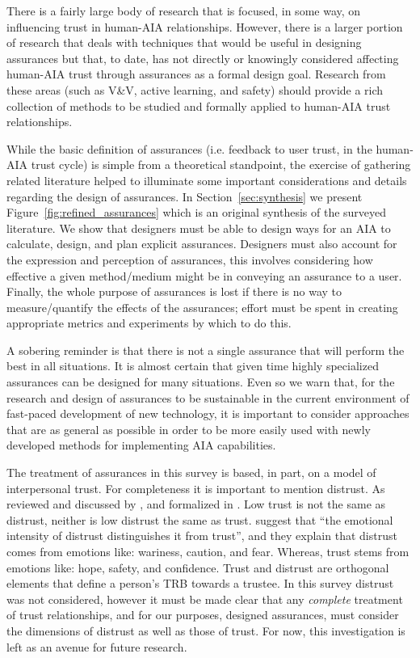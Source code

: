     There is a fairly large body of research that is focused, in some way, on influencing trust in human-AIA relationships. However, there is a larger portion of research that deals with techniques that would be useful in designing assurances but that, to date, has not directly or knowingly considered affecting human-AIA trust through assurances as a formal design goal. Research from these areas (such as V\&V, active learning, and safety) should provide a rich collection of methods to be studied and formally applied to human-AIA trust relationships.

    While the basic definition of assurances (i.e. feedback to user trust, in the human-AIA trust cycle) is simple from a theoretical standpoint, the exercise of gathering related literature helped to illuminate some important considerations and details regarding the design of assurances. In Section~\ref{sec:synthesis} we present Figure~\ref{fig:refined_assurances} which is an original synthesis of the surveyed literature. We show that designers must be able to design ways for an AIA to calculate, design, and plan explicit assurances. Designers must also account for the expression and perception of assurances, this involves considering how effective a given method/medium might be in conveying an assurance to a user. Finally, the whole purpose of assurances is lost if there is no way to measure/quantify the effects of the assurances; effort must be spent in creating appropriate metrics and experiments by which to do this.

    A sobering reminder is that there is not a single assurance that will perform the best in all situations. It is almost certain that given time highly specialized assurances can be designed for many situations. Even so we warn that, for the research and design of assurances to be sustainable in the current environment of fast-paced development of new technology, it is important to consider approaches that are as general as possible in order to be more easily used with newly developed methods for implementing AIA capabilities.

    The treatment of assurances in this survey is based, in part, on a model of interpersonal trust. For completeness it is important to mention distrust. As reviewed and discussed by \citet{Lewicki1998-ox}, and formalized in \citet{McKnight2001-hm,McKnight2001-gz}. Low trust is not the same as distrust, neither is low distrust the same as trust. \citet{McKnight2001-gz} suggest that ``the emotional intensity of distrust distinguishes it from trust'', and they explain that distrust comes from emotions like: wariness, caution, and fear. Whereas, trust stems from emotions like: hope, safety, and confidence. Trust and distrust are orthogonal elements that define a person's TRB towards a trustee. In this survey distrust was not considered, however it must be made clear that any \emph{complete} treatment of trust relationships, and for our purposes, designed assurances, must consider the dimensions of distrust as well as those of trust. For now, this investigation is left as an avenue for future research.

